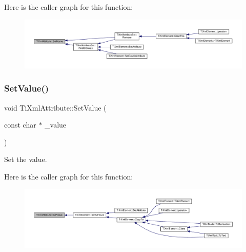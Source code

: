 Here is the caller graph for this function\+:
\nopagebreak
\begin{figure}[H]
\begin{center}
\leavevmode
\includegraphics[width=350pt]{class_ti_xml_attribute_ab7fa3d21ff8d7c5764cf9af15b667a99_icgraph}
\end{center}
\end{figure}
\mbox{\label{class_ti_xml_attribute_a2dae44178f668b3cb48101be4f2236a0}} 
\subsubsection{\texorpdfstring{Set\+Value()}{SetValue()}}
{\footnotesize\ttfamily void Ti\+Xml\+Attribute\+::\+Set\+Value (\begin{DoxyParamCaption}\item[{const char $\ast$}]{\+\_\+value }\end{DoxyParamCaption})\hspace{0.3cm}{\ttfamily [inline]}}



Set the value. 

Here is the caller graph for this function\+:
\nopagebreak
\begin{figure}[H]
\begin{center}
\leavevmode
\includegraphics[width=350pt]{class_ti_xml_attribute_a2dae44178f668b3cb48101be4f2236a0_icgraph}
\end{center}
\end{figure}
\mbox{\label{class_ti_xml_attribute_ac9f0b56fcacbedb6eb49e5f282bef014}} 
